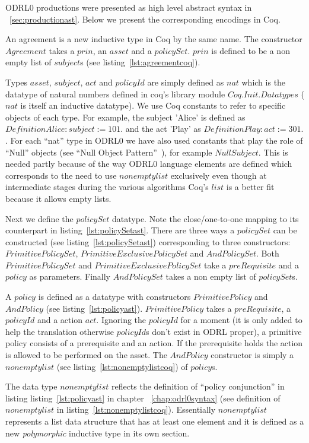 ODRL0 productions were presented as high level abstract syntax in ~\ref{sec:productionast}. Below we present the corresponding encodings in Coq. 

An agreement is a new inductive type in Coq by the same name. The constructor $Agreement$ takes a $prin$, an $asset$ and a $policySet$. $prin$ is defined to be a non empty list of $subject$s (see listing~\ref{lst:agreementcoq}). 

Types $asset$, $subject$, $act$ and $policyId$ are simply defined as $nat$ which is the datatype of natural numbers defined in coq's library module $Coq.Init.Datatypes$ ($nat$ is itself an inductive datatype). We use Coq constants to refer to specific objects of each type. For example, the subject 'Alice' is defined as $Definition Alice:subject := 101.$ and the act 'Play' as $Definition Play : act := 301.$. For each ``nat'' type in ODRL0 we have also used constants that play the role of ``Null'' objects (see ``Null Object Pattern''~\cite{martin1998pattern}), for example $NullSubject$. This is needed partly because of the way ODRL0 language elements are defined which corresponds to the need to use $nonemptylist$ exclusively even though at intermediate stages during the various algorithms Coq's $list$ is a better fit because it allows empty lists.

Next we define the $policySet$ datatype. Note the close/one-to-one mapping to its counterpart in listing~\ref{lst:policySetast}. There are three ways a $policySet$ can be constructed (see listing~\ref{lst:policySetast}) corresponding to three constructors: $PrimitivePolicySet$, $PrimitiveExclusivePolicySet$ and $AndPolicySet$. Both $PrimitivePolicySet$ and $PrimitiveExclusivePolicySet$ take a $preRequisite$ and a $policy$ as parameters. Finally $AndPolicySet$ takes a non empty list of $policySet$s.

A $policy$ is defined as a datatype with constructors $PrimitivePolicy$ and $AndPolicy$ (see listing~\ref{lst:policyast}). $PrimitivePolicy$ takes a $preRequisite$, a $policyId$ and a action $act$. Ignoring the $policyId$ for a moment (it is only added to help the translation otherwise $policyId$s don't exist in ODRL proper), a primitive policy consists of a prerequisite and an action. If the prerequisite holds the action is allowed to be performed on the asset. The $AndPolicy$ constructor is simply a $nonemptylist$ (see listing~\ref{lst:nonemptylistcoq}) of $policy$s. 

The data type $nonemptylist$ reflects the definition of ``policy conjunction'' in listing listing~\ref{lst:policyast} in chapter ~\ref{chap:odrl0syntax} (see definition of $nonemptylist$ in listing~\ref{lst:nonemptylistcoq}). Essentially $nonemptylist$ represents a list data structure that has at least one element and it is defined as a new \emph{polymorphic} inductive type in its own section. 

